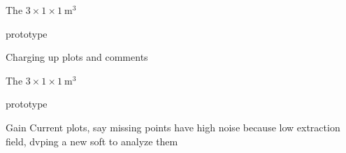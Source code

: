 \documentclass[10pt]{beamer}
\begin{document}
    \begin{frame}{The \texorpdfstring{$3 \times 1 \times \SI{1}{\meter\cubed}$}{311}
    		\begin{scriptsize}
    		\end{scriptsize} prototype}{Charging up}
    	plots and comments
    \end{frame}
    
    \begin{frame}{The \texorpdfstring{$3 \times 1 \times \SI{1}{\meter\cubed}$}{311}
    		\begin{scriptsize}
    		\end{scriptsize} prototype}{Gain}
    	Current plots, say missing points have high noise because low extraction field, dvping a new soft to analyze them
    \end{frame}
    
\end{document}
